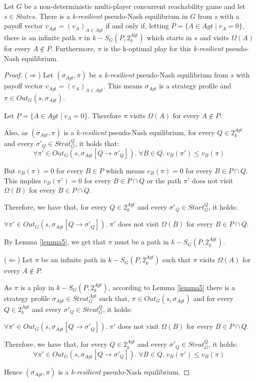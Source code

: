 \begin{theorem}
\label{theorem6}
Let $G$ be a non-deterministic multi-player concurrent reachability game and let $s \in States$. There is a \textit{k-resilient} pseudo-Nash equilibrium in $G$ from $s$ with a payoff vector $v_{Agt} = (v_{A})_{A\in Agt}$ if and only if, letting $P = \lbrace A \in Agt \; \vert \; v_{A} = 0 \rbrace$, there is an infinite path $\pi$ in $k-S_{G}(P, 2^{Agt}_{k})$ which starts in $s$ and visits $\Omega(A)$ for every $A \notin P$. Furthermore, $\pi$ is the k-optimal play for this \textit{k-resilient} pseudo-Nash equilibrium.
\end{theorem}

\begin{proof}
($\Rightarrow$) Let $(\sigma_{Agt}, \pi)$ be a \textit{k-resilient} pseudo-Nash equilibrium from $s$ with payoff vector $v_{Agt} = (v_{A})_{A\in Agt}$. This means $\sigma_{Agt}$ is a strategy profile and $\pi \in Out_{G}(s, \sigma_{Agt})$.

Let $P = \lbrace A \in Agt \; \vert \; v_{A} = 0 \rbrace$. Therefore $\pi$ visits $\Omega(A)$ for every $A \notin P$. 

Also, as $(\sigma_{Agt}, \pi)$ is a \textit{k-resilient} pseudo-Nash equilibrium, for every $Q \in 2^{Agt}_{k}$ and every $\sigma'_{Q} \in Strat^{Q}_{G}$, it holds that:
\[\forall \pi' \in Out_{G}(s, \sigma_{Agt}[Q \rightarrow \sigma'_{Q}]). \; \forall B \in Q. \; v_{B}(\pi') \leq v_{B}(\pi)\]

But $v_{B}(\pi) = 0$ for every $B \in P$ which means $v_{B}(\pi) = 0$ for every $B \in P \cap Q$. This implies $v_{B}(\pi') = 0$ for every $B \in P \cap Q$ or the path $\pi'$ does not visit $\Omega(B)$ for every $B \in P \cap Q$.

Therefore, we have that, for every $Q \in 2^{Agt}_{k}$ and every $\sigma'_{Q} \in Start^{Q}_{G}$, it holds:

$\forall \pi' \in Out_{G}(s, \sigma_{Agt}[Q \rightarrow \sigma'_{Q}]). \; \pi'$ does not visit $\Omega(B)$ for every $B \in P \cap Q$.

By Lemma \ref{lemma5}, we get that $\pi$ must be a path in $k-S_{G}(P, 2^{Agt}_{k})$.

($\Leftarrow$) Let $\pi$ be an infinite path in $k-S_{G}(P, 2^{Agt}_{k})$ such that $\pi$ visits $\Omega(A)$ for every $A \notin P$. 

As $\pi$ is a play in $k-S_{G}(P, 2^{Agt}_{k})$, according to Lemma \ref{lemma5} there is a strategy profile $\sigma_{Agt} \in Strat^{Agt}_{G}$ such that, $\pi \in Out_{G}(s, \sigma_{Agt})$ and for every $Q \in 2^{Agt}_{k}$ and every $\sigma'_{Q} \in Strat^{Q}_{G}$, it holds:

$\forall \pi' \in Out_{G}(s, \sigma_{Agt}[Q \rightarrow \sigma'_{Q}]). \; \pi'$ does not visit $\Omega(B)$ for every $B \in P \cap Q$.

Therefore, we have that, for every $Q \in 2^{Agt}_{k}$ and every $\sigma'_{Q} \in Strat^{Q}_{G}$, it holds:
\[\forall \pi' \in Out_{G}(s, \sigma_{Agt}[Q \rightarrow \sigma'_{Q}]). \; \forall B \in Q. \; v_{B}(\pi') \leq v_{B}(\pi)\]

Hence $(\sigma_{Agt}, \pi)$ is a \textit{k-resilient} pseudo-Nash equilibrium.
\end{proof}

